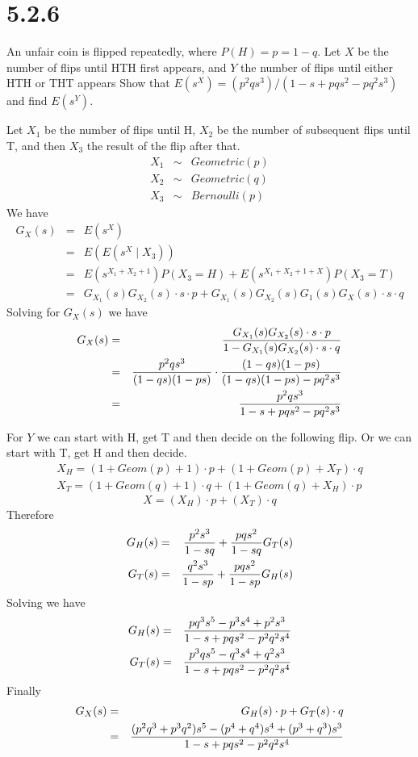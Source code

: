 \section*{5.2.6}
An unfair coin is flipped repeatedly, where $P(H)=p=1-q$.
Let $X$ be the number of flips until HTH first appears, and
$Y$ the number of flips until either HTH or THT appears
Show that
$E(s^X)=(p^2qs^3)/(1-s+pqs^2-pq^2s^3)$
and find $E(s^Y)$.

\bigskip
\noindent
Let $X_1$ be the number of flips until H, $X_2$ be the number
of subsequent flips until T, and then $X_3$ the result of the
flip after that.
\begin{eqnarray*}
X_1&\sim&Geometric(p)\\
X_2&\sim&Geometric(q)\\
X_3&\sim&Bernoulli(p)
\end{eqnarray*}
We have
\begin{eqnarray*}
G_X(s)&=&E(s^X)\\
&=&E(E(s^X\mid X_3))\\
&=&E(s^{X_1+X_2+1})P(X_3=H)+E(s^{X_1+X_2+1+X})P(X_3=T)\\
&=&G_{X_1}(s)G_{X_2}(s)\cdot s\cdot p
+G_{X_1}(s)G_{X_2}(s)G_1(s)G_X(s)\cdot s\cdot q
\end{eqnarray*}
Solving for $G_X(s)$ we have
\begin{eqnarray*}
G_X(s)&=&{
G_{X_1}(s)G_{X_2}(s)\cdot s\cdot p
\over
1-G_{X_1}(s)G_{X_2}(s)\cdot s\cdot q
}\\
&=&{p^2qs^3\over(1-qs)(1-ps)}
\cdot
{(1-qs)(1-ps)\over(1-qs)(1-ps)-pq^2s^3}\\
&=&
{p^2qs^3\over1-s+pqs^2-pq^2s^3}
\end{eqnarray*}

\bigskip
\noindent
For $Y$ we can start with H, get T and then decide on the following
flip.
Or we can start with T, get H and then decide.
\begin{eqnarray*}
X_H=(1+Geom(p)+1)\cdot p+(1+Geom(p)+X_T)\cdot q\\
X_T=(1+Geom(q)+1)\cdot q+(1+Geom(q)+X_H)\cdot p
\end{eqnarray*}
$$X=(X_H)\cdot p+(X_T)\cdot q$$
Therefore
\begin{eqnarray*}
G_H(s)&=&{p^2s^3\over1-sq}+{pqs^2\over1-sq}G_T(s)\\
G_T(s)&=&{q^2s^3\over1-sp}+{pqs^2\over1-sp}G_H(s)
\end{eqnarray*}
Solving we have
\begin{eqnarray*}
G_H(s)&=&{pq^3s^5-p^3s^4+p^2s^3\over1-s+pqs^2-p^2q^2s^4}\\
G_T(s)&=&{p^3qs^5-q^3s^4+q^2s^3\over1-s+pqs^2-p^2q^2s^4}
\end{eqnarray*}
Finally
\begin{eqnarray*}
G_X(s)&=&G_H(s)\cdot p+G_T(s)\cdot q\\
&=&{(p^2q^3+p^3q^2)s^5-(p^4+q^4)s^4+(p^3+q^3)s^3
\over1-s+pqs^2-p^2q^2s^4}
\end{eqnarray*}
